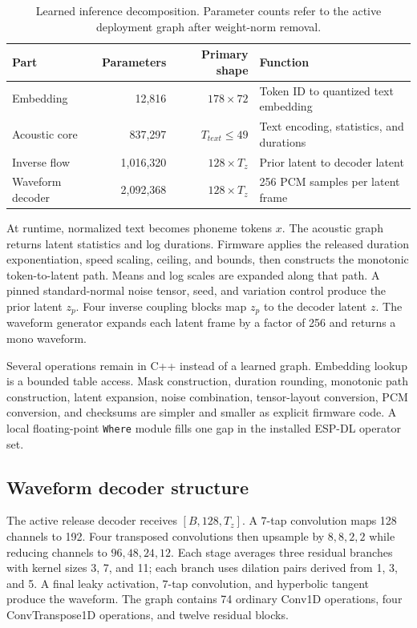 \documentclass[10pt]{article}
\begin{document}
\begin{table}[t]
\centering
\caption{Learned inference decomposition. Parameter counts refer to the active
deployment graph after weight-norm removal.}
\label{tab:modelparts}
\small
\begin{tabularx}{\linewidth}{@{}lrrY@{}}
\toprule
Part & Parameters & Primary shape & Function \\
\midrule
Embedding & 12,816 & $178\times72$ & Token ID to quantized text embedding \\
Acoustic core & 837,297 & $T_{text}\leq49$ & Text encoding, statistics, and durations \\
Inverse flow & 1,016,320 & $128\times T_z$ & Prior latent to decoder latent \\
Waveform decoder & 2,092,368 & $128\times T_z$ & 256 PCM samples per latent frame \\
\bottomrule
\end{tabularx}
\end{table}

At runtime, normalized text becomes phoneme tokens $x$. The acoustic graph
returns latent statistics and log durations. Firmware applies the released
duration exponentiation, speed scaling, ceiling, and bounds, then constructs
the monotonic token-to-latent path. Means and log scales are expanded along
that path. A pinned standard-normal noise tensor, seed, and variation control
produce the prior latent $z_p$. Four inverse coupling blocks map $z_p$ to the
decoder latent $z$. The waveform generator expands each latent frame by a
factor of 256 and returns a mono waveform.

Several operations remain in C++ instead of a learned graph. Embedding lookup
is a bounded table access. Mask construction, duration rounding, monotonic
path construction, latent expansion, noise combination, tensor-layout
conversion, PCM conversion, and checksums are simpler and smaller as explicit
firmware code. A local floating-point \texttt{Where} module fills one gap in
the installed ESP-DL operator set.

\subsection{Waveform decoder structure}

The active release decoder receives $[B,128,T_z]$. A $7$-tap convolution maps
128 channels to 192. Four transposed convolutions then upsample by
$8,8,2,2$ while reducing channels to $96,48,24,12$. Each stage averages three
residual branches with kernel sizes 3, 7, and 11; each branch uses dilation
pairs derived from 1, 3, and 5. A final leaky activation, $7$-tap convolution,
and hyperbolic tangent produce the waveform. The graph contains 74 ordinary
Conv1D operations, four ConvTranspose1D operations, and twelve residual
blocks.
\end{document}
